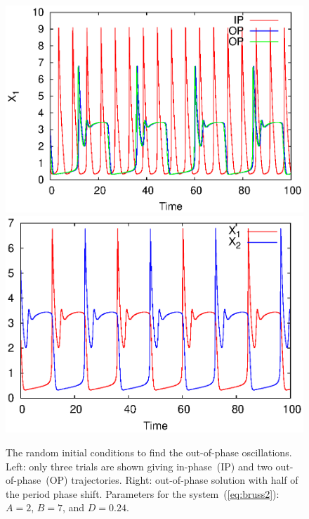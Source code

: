 \documentclass[11pt,a4paper]{article}
\begin{document}
\begin{figure}[h]
  \centering
  \includegraphics[scale=0.45]{br2_rnd_op}
  \includegraphics[scale=0.45]{br2_op}
  \caption{The random initial conditions to find the out-of-phase oscillations. Left:
    only three trials are shown giving in-phase~(IP) and two out-of-phase~(OP)
    trajectories. Right: out-of-phase solution with half of the period phase
    shift. Parameters for the system~(\ref{eq:bruss2}): $A=2$, $B=7$, and $D=0.24$. }
  \label{fig:br2_rnd_op}
\end{figure}
\end{document}
